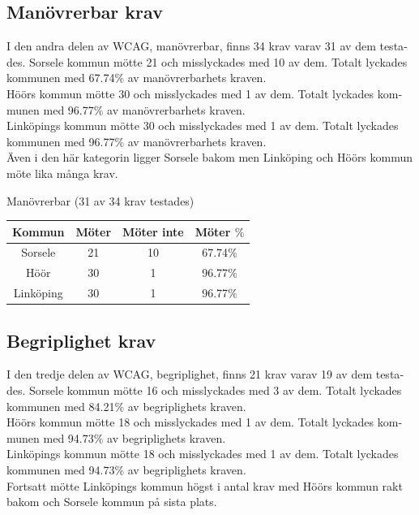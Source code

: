 \documentclass[11p]{article}
\begin{document}
\begin{otherlanguage}{swedish}
    \subsection{Manövrerbar krav}
    I den andra delen av WCAG, manövrerbar, finns 34 krav varav 31 av dem testades.
    Sorsele kommun mötte 21 och misslyckades med 10 av dem.
    Totalt lyckades kommunen med 67.74$\%$ av manövrerbarhets kraven.
    \\Höörs kommun mötte 30 och misslyckades med 1 av dem.
    Totalt lyckades kommunen med 96.77$\%$ av manövrerbarhets kraven.
    \\Linköpings kommun mötte 30 och misslyckades med 1 av dem.
    Totalt lyckades kommunen med 96.77$\%$ av manövrerbarhets kraven.
    \\Även i den här kategorin ligger Sorsele bakom men Linköping och Höörs kommun möte lika många krav.

    \begin{center}
    Manövrerbar (31 av 34 krav testades)

    \begin{tabular}{ |c|c|c|c|}
        \hline
        Kommun & Möter & Möter inte & Möter $\%$ \\  \hline
        Sorsele & 21 & 10 & 67.74$\%$ \\ \hline
        Höör & 30 & 1 & 96.77$\%$ \\ \hline
        Linköping & 30 & 1 & 96.77$\%$ \\ \hline
    \end{tabular}
    \end{center}

    \subsection{Begriplighet krav}
    I den tredje delen av WCAG, begriplighet, finns 21 krav varav 19 av dem testades.
    Sorsele kommun mötte 16 och misslyckades med 3 av dem.
    Totalt lyckades kommunen med 84.21$\%$ av begriplighets kraven.
    \\Höörs kommun mötte 18 och misslyckades med 1 av dem.
    Totalt lyckades kommunen med 94.73$\%$ av begriplighets kraven.
    \\Linköpings kommun mötte 18 och misslyckades med 1 av dem.
    Totalt lyckades kommunen med 94.73$\%$ av begriplighets kraven.
    \\Fortsatt mötte Linköpings kommun högst i antal krav med Höörs kommun rakt bakom och Sorsele kommun på sista plats.


\end{otherlanguage}
\end{document}
